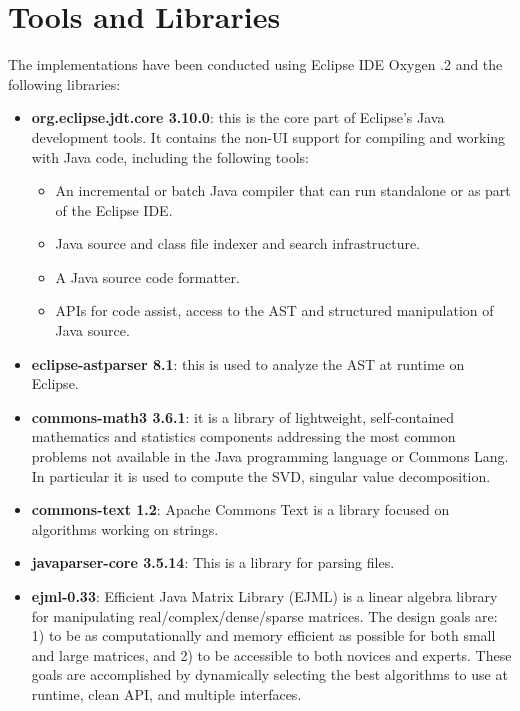 

\section{Tools and Libraries}

The implementations have been conducted using Eclipse IDE Oxygen .2 and the following libraries:

\begin{itemize}
\item \textbf{org.eclipse.jdt.core 3.10.0}: this is the core part of Eclipse's Java development tools. It contains the non-UI support for compiling and working with Java code, including the following tools:
	\begin{itemize}
	\item An incremental or batch Java compiler that can run standalone or as part of the Eclipse IDE.
	\item Java source and class file indexer and search infrastructure.
	\item A Java source code formatter.
	\item APIs for code assist, access to the AST and structured manipulation of Java source.
	\end{itemize}
\item \textbf{eclipse-astparser 8.1}: this is used to analyze the AST at runtime on Eclipse.
\item \textbf{commons-math3 3.6.1}: it is a library of lightweight, self-contained mathematics and statistics components addressing the most common problems not available in the Java programming language or Commons Lang. In particular it is used to compute the SVD, singular value decomposition.
\item \textbf{commons-text 1.2}: Apache Commons Text is a library focused on algorithms working on strings. 
\item \textbf{javaparser-core 3.5.14}: This is a library for parsing  files.
\item \textbf{ejml-0.33}: Efficient Java Matrix Library (EJML) is a linear algebra library for manipulating real/complex/dense/sparse matrices. The design goals are: 1) to be as computationally and memory efficient as possible for both small and large matrices, and 2) to be accessible to both novices and experts. These goals are accomplished by dynamically selecting the best algorithms to use at runtime, clean API, and multiple interfaces.
\end{itemize}

